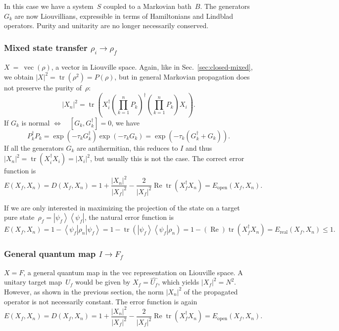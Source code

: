 \documentclass[aps, pra, a4paper, longbibliography]{revtex4}
\newcommand{\I}{I}
\newcommand{\be}{\begin{equation}}
\newcommand{\ee}{\end{equation}}
\newcommand{\eq}{\Leftrightarrow}
\newcommand{\ket}[1]{\left| #1 \right \rangle}
\newcommand{\bra}[1]{\left \langle #1 \right|}
\newcommand{\ketbra}[2]{\left| #1 \right \rangle \left \langle #2 \right|}
\DeclareMathOperator{\tr}{tr}
\DeclareMathOperator{\re}{Re}
\DeclareMathOperator{\cvec}{vec}
\begin{document}
In this case we have a system~$S$ coupled to a Markovian bath~$B$.
The generators~$G_k$ are now Liouvillians, expressible in terms of
Hamiltonians and Lindblad operators. Purity and unitarity are no
longer necessarily conserved.


\subsubsection{Mixed state transfer $\rho_i \to \rho_f$}

$X~=~\cvec(\rho)$, a vector in Liouville space. Again, like in
Sec.~\ref{sec:closed-mixed}, we obtain
$|X|^2 = \tr(\rho^2) = P(\rho)$, but in general Markovian propagation
does not preserve the purity of~$\rho$:
\be
|X_n|^2 = \tr\left(X_i^\dagger \left(\prod_{k=1}^{n} P_k\right)^\dagger \left(\prod_{k=1}^{n} P_k\right) X_i\right).
\ee
If $G_k$ is normal $\eq \quad [G_k, G^\dagger_k] = 0$, we have
\be
P_k^\dagger P_k
= \exp(-\tau_k G^\dagger_k) \exp(-\tau_k G_k)
= \exp(-\tau_k (G_k^\dagger + G_k)).
\ee
If all the generators $G_k$ are antihermitian, this reduces to $\I$ and thus
$|X_n|^2 = \tr(X_i^\dagger X_i) = |X_i|^2$, but usually this is not
the case.
The correct error function is
\be
E(X_f, X_n)
= D(X_f, X_n)
= 1 +\frac{|X_n|^2}{|X_f|^2} -\frac{2}{|X_f|^2} \re \tr(X_f^\dagger X_n)
= E_\text{open}(X_f, X_n).
\ee

If we are only interested in maximizing the projection of
the state on a target pure state~$\rho_f = \ketbra{\psi_f}{\psi_f}$, the natural error
function is
\be
E(X_f, X_n)
= 1 -\bra{\psi_f} \rho_n \ket{\psi_f}
= 1 -\tr\left(\ketbra{\psi_f}{\psi_f} \rho_n \right)
= 1 -(\re) \tr\left(X_f^\dagger X_n\right)
= E_\text{real}(X_f, X_n) \le 1.
\ee





\subsubsection{General quantum map $\I \to F_f$}

$X = F$, a general quantum map in the vec representation on Liouville space.
A unitary target map~$U_f$ would be given by
$X_f = \hat{U_f}$, which yields $|X_f|^2 = N^2$.
However, as shown in the previous section, the norm $|X_n|^2$ of the propagated operator
is not necessarily constant. The error function is again
\be
E(X_f, X_n)
= D(X_f, X_n)
= 1 +\frac{|X_n|^2}{|X_f|^2} -\frac{2}{|X_f|^2} \re \tr(X_f^\dagger X_n)
= E_\text{open}(X_f, X_n).
\ee
\end{document}
